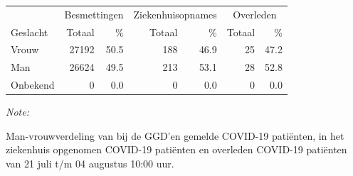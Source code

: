 \documentclass[
  english,
  man,floatsintext]{apa6}
\begin{document}
\begin{table}
\centering\begingroup\fontsize{11}{13}\selectfont

\begin{threeparttable}
\begin{tabular}{lrrrrrr}
\toprule
\multicolumn{1}{c}{ } & \multicolumn{2}{c}{Besmettingen} & \multicolumn{2}{c}{Ziekenhuisopnames} & \multicolumn{2}{c}{Overleden} \\
\cmidrule(l{3pt}r{3pt}){2-3} \cmidrule(l{3pt}r{3pt}){4-5} \cmidrule(l{3pt}r{3pt}){6-7}
Geslacht & Totaal & \% & Totaal & \% & Totaal & \%\\
\midrule
Vrouw & 27192 & 50.5 & 188 & 46.9 & 25 & 47.2\\
Man & 26624 & 49.5 & 213 & 53.1 & 28 & 52.8\\
Onbekend & 0 & 0.0 & 0 & 0.0 & 0 & 0.0\\
\bottomrule
\end{tabular}
\begin{tablenotes}
\item \textit{Note: } 
\item Man-vrouwverdeling van bij de GGD’en gemelde COVID-19 patiënten, in het ziekenhuis opgenomen COVID-19 patiënten en overleden COVID-19 patiënten van 21 juli t/m 04 augustus 10:00 uur.
\end{tablenotes}
\end{threeparttable}
\endgroup{}
\end{table}
\newpage
\end{document}
